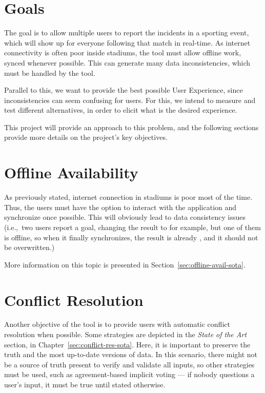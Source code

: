 \section{Goals}
The goal is to allow multiple users to report the incidents in a sporting event, which will show up for everyone following that match in real-time. As internet connectivity is often poor inside stadiums, the tool must allow offline work, synced whenever possible. This can generate many data inconsistencies, which must be handled by the tool.

Parallel to this, we want to provide the best possible User Experience, since inconsistencies can seem confusing for users. For this, we intend to measure and test different alternatives, in order to elicit what is the desired experience. 

This project will provide an approach to this problem, and the following sections provide more details on the project's key objectives.

\section{Offline Availability} \label{sec:offline-avail-intro}

As previously stated, internet connection in stadiums is poor most of the time. Thus, the users must have the option to interact with the application and synchronize once possible. This will obviously lead to data consistency issues (i.e.,\ two users report a goal, changing the result to  for example, but one of them is offline, so when it finally synchronizes, the result is already , and it should not be overwritten.)

More information on this topic is presented in Section~\ref{sec:offline-avail-sota}.

\section{Conflict Resolution} \label{sec:conflict-res-intro}

Another objective of the tool is to provide users with automatic conflict resolution when possible. Some strategies are depicted in the \textit{State of the Art} section, in Chapter~\ref{sec:conflict-res-sota}. Here, it is important to preserve the truth and the most up-to-date versions of data. In this scenario, there might not be a source of truth present to verify and validate all inputs, so other strategies must be used, such as agreement-based implicit voting --- if nobody questions a user's input, it must be true until stated otherwise.


